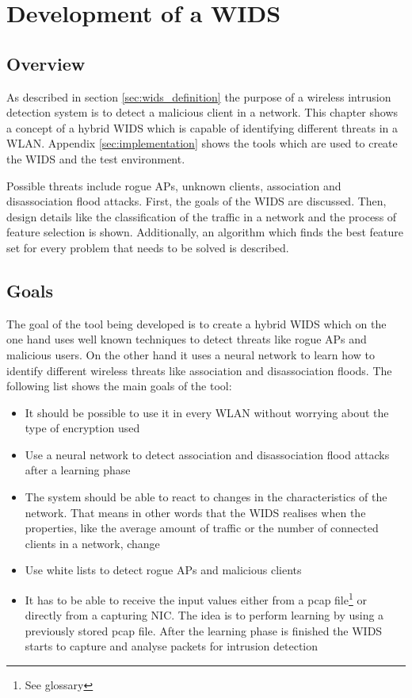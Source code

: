 \chapter{Development of a WIDS}

\section{Overview}

As described in section \ref{sec:wids_definition} the purpose of a wireless intrusion detection system is to detect a malicious client in a network. This chapter shows a concept of a hybrid WIDS which is capable of identifying different threats in a WLAN. Appendix \ref{sec:implementation} shows the tools which are used to create the WIDS and the test environment.

Possible threats include rogue APs, unknown clients, association and disassociation flood attacks. First, the goals of the WIDS are discussed. Then, design details like the classification of the traffic in a network and the process of feature selection is shown. Additionally, an algorithm which finds the best feature set for every problem that needs to be solved is described.

\section{Goals}

The goal of the tool being developed is to create a hybrid WIDS which on the one hand uses well known techniques to detect threats like rogue APs and malicious users. On the other hand it uses a neural network to learn how to identify different wireless threats like association and disassociation floods. The following list shows the main goals of the tool:
\vspace{-0.5em}
\begin{itemize}
	\item It should be possible to use it in every WLAN without worrying about the type of encryption used
	\item Use a neural network to detect association and disassociation flood attacks after a learning phase
	\item The system should be able to react to changes in the characteristics of the network. That means in other words that the WIDS realises when the properties, like the average amount of traffic or the number of connected clients in a network, change
	\item Use white lists to detect rogue APs and malicious clients
	\item It has to be able to receive the input values either from a pcap file\footnote{See glossary} or directly from a capturing NIC. The idea is to perform learning by using a previously stored pcap file. After the learning phase is finished the WIDS starts to capture and analyse packets for intrusion detection

\end{itemize}

